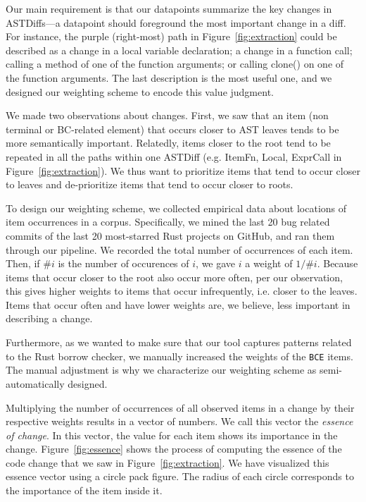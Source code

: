 Our main requirement is that our datapoints summarize the key changes in ASTDiffs---a datapoint should foreground the most important change in a diff. For instance, the purple (right-most) path in Figure~\ref{fig:extraction} could be described as a change in a local variable declaration; a change in a function call; calling a method of one of the function arguments; or calling clone() on one of the function arguments. The last description is the most useful one, and we designed our weighting scheme to encode this value judgment.

We made two observations about changes. First, we saw that an item (non terminal or BC-related element) that occurs closer to AST leaves tends to be more semantically important. Relatedly, items closer to the root tend to be repeated in all the paths within one ASTDiff (e.g. ItemFn, Local, ExprCall in Figure~\ref{fig:extraction}). We thus want to prioritize items that tend to occur closer to leaves and de-prioritize items that tend to occur closer to roots.

To design our weighting scheme, we collected empirical data about locations of item occurrences in a corpus. Specifically, we mined the last 20 bug related commits of the last 20 most-starred Rust projects on GitHub, and ran them through our pipeline. We recorded the total number of occurrences of each item. Then, if $\# i$ is the number of occurences of $i$, we gave $i$ a weight of $1/\# i$. Because items that occur closer to the root also occur more often, per our observation, this gives higher weights to items that occur infrequently, i.e. closer to the leaves. Items that occur often and have lower weights are, we believe, less important in describing a change.

Furthermore, as we wanted to make sure that our tool captures patterns related to the Rust borrow checker, we manually increased the weights of the \texttt{BCE} items. The manual adjustment is why we characterize our weighting scheme as semi-automatically designed. 

Multiplying the number of occurrences of all observed items in a change by their respective weights results in a vector of numbers. We call this vector the \emph{essence of change}. In this vector, the value for each item shows its importance in the change. Figure~\ref{fig:essence} shows the process of computing the essence of the code change that we saw in Figure~\ref{fig:extraction}. We have visualized this essence vector using a circle pack figure. The radius of each circle corresponds to the importance of the item inside it.

